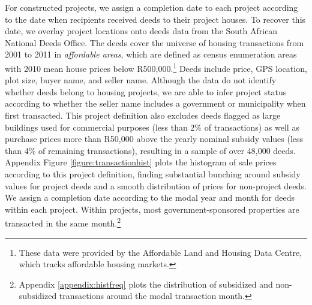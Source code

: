 \documentclass[12pt]{article}
\begin{document}

For constructed projects, we assign a completion date to each project according to the date when recipients received deeds to their project houses.  To recover this date, we overlay project locations onto deeds data from the South African National Deeds Office.  The deeds cover the universe of housing transactions from 2001 to 2011 in {\it affordable areas}, which are defined as census enumeration areas with 2010 mean house prices below R500,000.\footnote{These data were provided by the Affordable Land and Housing Data Centre, which tracks affordable housing markets.} Deeds include price, GPS location, plot size, buyer name, and seller name.  Although the data do not identify whether deeds belong to housing projects, we are able to infer project status according to whether the seller name includes a government or municipality when first transacted.  This project definition also excludes deeds flagged as large buildings used for commercial purposes (less than 2\% of transactions) as well as purchase prices more than R50,000 above the yearly nominal subsidy values (less than 4\% of remaining transactions), resulting in a sample of over 48,000 deeds.  Appendix Figure \ref{figure:transactionhist} plots the histogram of sale prices according to this project definition, finding substantial bunching around subsidy values for project deeds and a smooth distribution of prices for non-project deeds.  We assign a completion date according to the modal year and month for deeds within each project.  Within projects, most government-sponsored properties are transacted in the same month.\footnote{Appendix \ref{appendix:histfreq} plots the distribution of subsidized and non-subsidized transactions around the modal transaction month.} 
\end{document}
